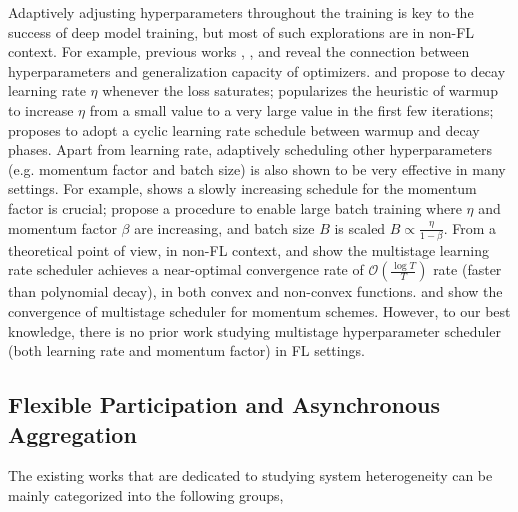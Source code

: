 Adaptively adjusting hyperparameters throughout the training is key to the success of deep model training, but most of such explorations are in non-FL context. For example, previous works \cite{He19ControlBatch}, \cite{Sun22Hyperparameters}, and \cite{Sun23Diffusion} reveal the connection between hyperparameters and generalization capacity of optimizers. \cite{Krizhevsky12ImageNet} and \cite{He16Res} propose to decay learning rate $\eta$ whenever the loss saturates; \cite{GoyalDGNWKTJH17LargeMinibatch} popularizes the heuristic of warmup to increase $\eta$ from a small value to a very large value in the first few iterations; \cite{Smith17Cyclic} proposes to adopt a cyclic learning rate schedule between warmup and decay phases. Apart from learning rate, adaptively scheduling other hyperparameters (e.g. momentum factor and batch size) is also shown to be very effective in many settings. For example, \cite{Sutskever13Init} shows a slowly increasing schedule for the momentum factor is crucial; \cite{Smith18Bayesian,Smith18DontDecay} propose a procedure to enable large batch training where $\eta$ and momentum factor $\beta$ are increasing, and batch size $B$ is scaled $B \propto \frac{\eta}{1-\beta}$. From a theoretical point of view, in non-FL context, \cite{Ge2019TheSD} and \cite{wang21stepdecay} show the multistage learning rate scheduler achieves a near-optimal convergence rate of $\mathcal{O}\left(\frac{\log T}{T}\right)$ rate (faster than polynomial decay), in both convex and non-convex functions. \cite{sun21stagewise} and \cite{Sun23TKDD} show the convergence of multistage scheduler for momentum schemes. However, to our best knowledge, there is no prior work studying multistage hyperparameter scheduler (both learning rate and momentum factor) in FL settings.

\subsection{Flexible Participation and Asynchronous Aggregation}
\label{subsec:asyn_aggregation_related_work}

The existing works that are dedicated to studying system heterogeneity can be mainly categorized into the following groups,

\iffalse

